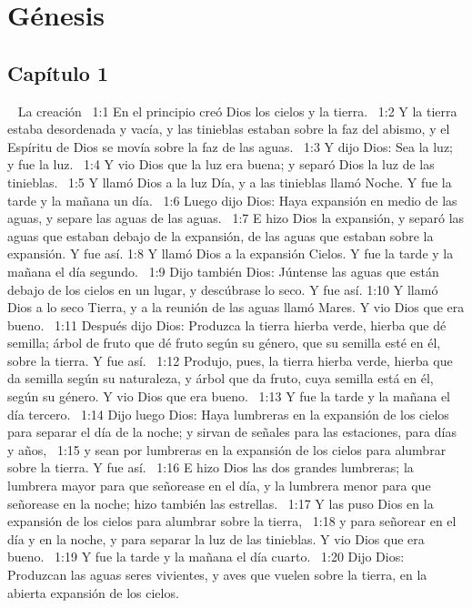 
\chapter{Génesis}

\section*{Capítulo 1}
 
La creación  
1:1 En el principio creó Dios los cielos y la tierra.  
1:2 Y la tierra estaba desordenada y vacía, y las tinieblas estaban sobre la faz del abismo, y el Espíritu de Dios se movía sobre la faz de las aguas.  
1:3 Y dijo Dios: Sea la luz;  y fue la luz.  
1:4 Y vio Dios que la luz era buena; y separó Dios la luz de las tinieblas.  
1:5 Y llamó Dios a la luz Día, y a las tinieblas llamó Noche. Y fue la tarde y la mañana un día.  
1:6 Luego dijo Dios: Haya expansión en medio de las aguas, y separe las aguas de las aguas.  
1:7 E hizo Dios la expansión, y separó las aguas que estaban debajo de la expansión, de las aguas que estaban sobre la expansión. Y fue así. 
1:8 Y llamó Dios a la expansión Cielos. Y fue la tarde y la mañana el día segundo.  
1:9 Dijo también Dios: Júntense las aguas que están debajo de los cielos en un lugar, y descúbrase lo seco. Y fue así. 
1:10 Y llamó Dios a lo seco Tierra, y a la reunión de las aguas llamó Mares. Y vio Dios que era bueno.  
1:11 Después dijo Dios: Produzca la tierra hierba verde, hierba que dé semilla; árbol de fruto que dé fruto según su género, que su semilla esté en él, sobre la tierra. Y fue así.  
1:12 Produjo, pues, la tierra hierba verde, hierba que da semilla según su naturaleza, y árbol que da fruto, cuya semilla está en él, según su género. Y vio Dios que era bueno.  
1:13 Y fue la tarde y la mañana el día tercero.  
1:14 Dijo luego Dios: Haya lumbreras en la expansión de los cielos para separar el día de la noche; y sirvan de señales para las estaciones, para días y años,  
1:15 y sean por lumbreras en la expansión de los cielos para alumbrar sobre la tierra. Y fue así.  
1:16 E hizo Dios las dos grandes lumbreras; la lumbrera mayor para que señorease en el día, y la lumbrera menor para que señorease en la noche; hizo también las estrellas.  
1:17 Y las puso Dios en la expansión de los cielos para alumbrar sobre la tierra,  
1:18 y para señorear en el día y en la noche, y para separar la luz de las tinieblas. Y vio Dios que era bueno.  
1:19 Y fue la tarde y la mañana el día cuarto.  
1:20 Dijo Dios: Produzcan las aguas seres vivientes, y aves que vuelen sobre la tierra, en la abierta expansión de los cielos.  
